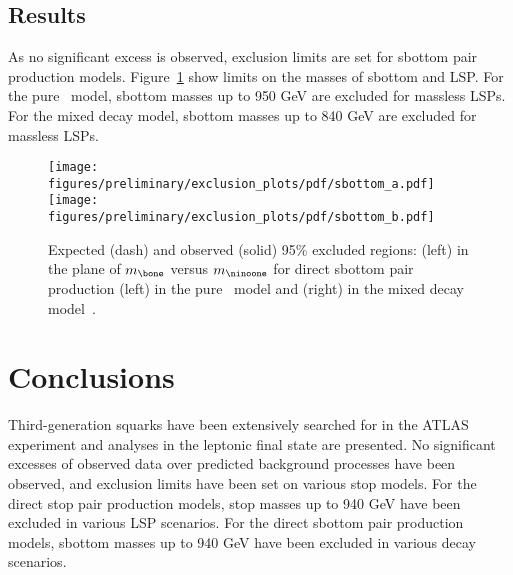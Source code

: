 \documentclass[UKenglish,10pt]{article}
\def\Acknowledgements{\bigskip  \bigskip \begin{center} \begin{large}
             \bf ACKNOWLEDGEMENTS \end{large}\end{center}}
\begin{document}
\subsection{Results}

As no significant excess is observed, exclusion limits are set for sbottom pair production models. Figure~\ref{fig:sbottom-summary} show limits on the masses of sbottom and LSP. For the pure \bottomLSP\ model, sbottom masses up to 950 GeV are excluded for massless LSPs. For the mixed decay model, sbottom masses up to 840 GeV are excluded for massless LSPs.

\begin{figure}[htbp]
        \centering
        \texttt{[image: figures/preliminary/exclusion\_plots/pdf/sbottom\_a.pdf]}
        \texttt{[image: figures/preliminary/exclusion\_plots/pdf/sbottom\_b.pdf]}%
        \caption{Expected (dash) and observed (solid) 95\% excluded regions: (left) in the plane of $m_{\bone}$ versus $m_{\ninoone}$ for direct sbottom pair production (left) in the pure \bottomLSP\ model and (right) in the mixed decay model~\cite{ATL-CONF-2017-038}.
        }
        \label{fig:sbottom-summary}
\end{figure}

\section{Conclusions}

Third-generation squarks have been extensively searched for in the ATLAS experiment and analyses in the leptonic final state are presented. No significant excesses of observed data over predicted background processes have been observed, and exclusion limits have been set on various stop models. For the direct stop pair production models, stop masses up to 940 GeV have been excluded in various LSP scenarios. For the direct sbottom pair production models, sbottom masses up to 940 GeV have been excluded in various decay scenarios. 

\end{document}
